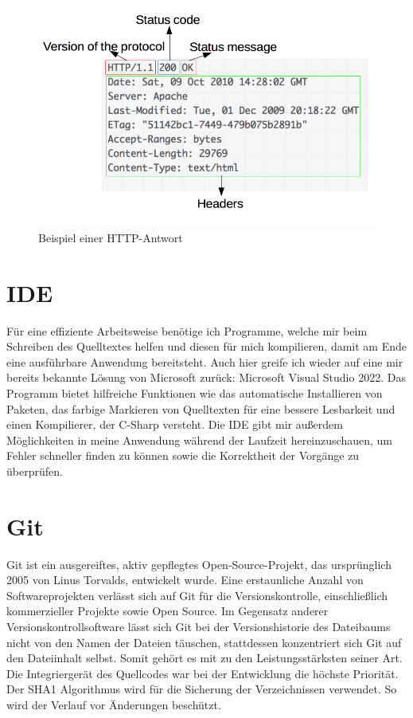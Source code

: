 \begin{figure}[ht]
	\centering
	\includegraphics[width=0.7\linewidth]{http_response.png}
	\caption{Beispiel einer HTTP-Antwort}
	\label{http-response}
\end{figure}

\section{IDE}
Für eine effiziente Arbeitsweise benötige ich Programme, welche mir beim Schreiben des Quelltextes helfen und diesen für mich kompilieren, damit am Ende eine ausführbare Anwendung bereitsteht. Auch hier greife ich wieder auf eine mir bereits bekannte Lösung von Microsoft zurück: Microsoft Visual Studio 2022. Das Programm bietet hilfreiche Funktionen wie das automatische Installieren von Paketen, das farbige Markieren von Quelltexten für eine bessere Lesbarkeit und einen Kompilierer, der C-Sharp versteht. Die IDE gibt mir außerdem Möglichkeiten in meine Anwendung während der Laufzeit hereinzuschauen, um Fehler schneller finden zu können sowie die Korrektheit der Vorgänge zu überprüfen.

\section{Git}
Git ist ein ausgereiftes, aktiv gepflegtes Open-Source-Projekt, das ursprünglich 2005 von Linus Torvalds, entwickelt wurde.
Eine erstaunliche Anzahl von Softwareprojekten verlässt sich auf Git für die Versionskontrolle, einschließlich kommerzieller Projekte sowie Open Source.
Im Gegensatz anderer Versionskontrollsoftware lässt sich Git bei der Versionshistorie des Dateibaums nicht von den Namen der Dateien täuschen, stattdessen konzentriert sich Git auf den Dateiinhalt selbst.
Somit gehört es mit zu den Leistungsstärksten seiner Art.
Die Integriergerät des Quellcodes war bei der Entwicklung die höchste Priorität. Der SHA1 Algorithmus wird für die Sicherung der Verzeichnissen verwendet. So wird der Verlauf vor Änderungen beschützt.

